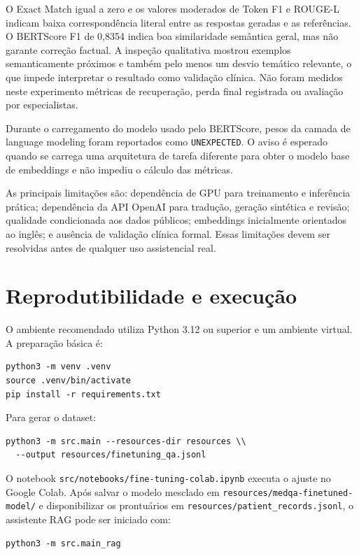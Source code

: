 \documentclass[12pt,a4paper]{article}
\begin{document}
O Exact Match igual a zero e os valores moderados de Token F1 e ROUGE-L indicam baixa correspondência literal entre as respostas geradas e as referências. O BERTScore F1 de 0,8354 indica boa similaridade semântica geral, mas não garante correção factual. A inspeção qualitativa mostrou exemplos semanticamente próximos e também pelo menos um desvio temático relevante, o que impede interpretar o resultado como validação clínica. Não foram medidos neste experimento métricas de recuperação, perda final registrada ou avaliação por especialistas.

Durante o carregamento do modelo usado pelo BERTScore, pesos da camada de language modeling foram reportados como \texttt{UNEXPECTED}. O aviso é esperado quando se carrega uma arquitetura de tarefa diferente para obter o modelo base de embeddings e não impediu o cálculo das métricas.

As principais limitações são: dependência de GPU para treinamento e inferência prática; dependência da API OpenAI para tradução, geração sintética e revisão; qualidade condicionada aos dados públicos; embeddings inicialmente orientados ao inglês; e ausência de validação clínica formal. Essas limitações devem ser resolvidas antes de qualquer uso assistencial real.

\section{Reprodutibilidade e execução}

O ambiente recomendado utiliza Python 3.12 ou superior e um ambiente virtual. A preparação básica é:
\begin{verbatim}
python3 -m venv .venv
source .venv/bin/activate
pip install -r requirements.txt
\end{verbatim}

Para gerar o dataset:
\begin{verbatim}
python3 -m src.main --resources-dir resources \\
  --output resources/finetuning_qa.jsonl
\end{verbatim}

O notebook \texttt{src/notebooks/fine-tuning-colab.ipynb} executa o ajuste no Google Colab. Após salvar o modelo mesclado em \texttt{resources/medqa-finetuned-model/} e disponibilizar os prontuários em \texttt{resources/patient\_records.jsonl}, o assistente RAG pode ser iniciado com:
\begin{verbatim}
python3 -m src.main_rag
\end{verbatim}
\end{document}
